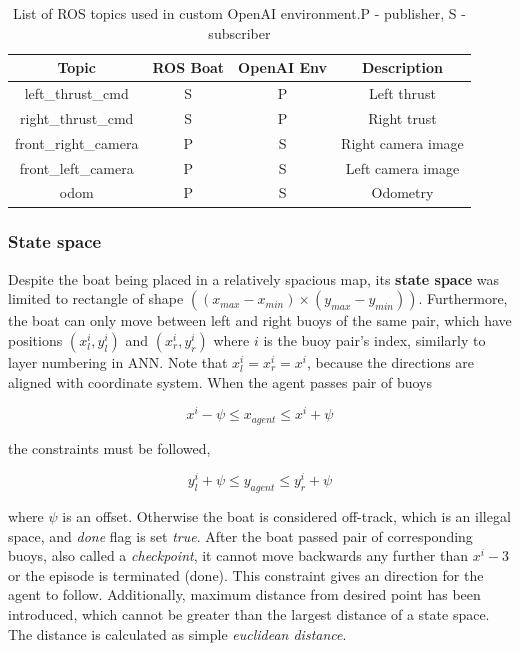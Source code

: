 \begin{table}[h]
    \centering
    \begin{tabular}{||c c c c||}
        \hline
        Topic & ROS Boat &  OpenAI Env & Description \\
        \hline\hline
        left\_thrust\_cmd & S & P & Left thrust \\
        right\_thrust\_cmd & S & P & Right trust \\
        front\_right\_camera & P & S & Right camera image \\
        front\_left\_camera & P & S & Left camera image \\
        odom & P & S & Odometry \\
        \hline
    \end{tabular}
    \caption{List of ROS topics used in custom OpenAI environment.\newline P - publisher, S - subscriber}
    \label{tab:ros-topics}
\end{table}

\subsubsection*{State space}
\label{sub2:state-space}

Despite the boat being placed in a relatively spacious map, its \textbf{state space} was limited to rectangle of shape $\left( (x_{max} - x_{min}) \times (y_{max} - y_{min})\right)$. Furthermore, the boat can only move between left and right buoys of the same pair, which have positions $(x^i_l, y^i_l)$ and $(x^i_r, y^i_r)$ where $i$ is the buoy pair's index, similarly to layer numbering in ANN. Note that $x^i_l = x^i_r = x^i$, because the directions are aligned with coordinate system. When the agent passes pair of buoys

\begin{equation}
    x^i - \psi \leq x_{agent} \leq x^i + \psi
\label{eq:5.1}
\end{equation}

the constraints must be followed,

\begin{equation}
    y^i_l + \psi \leq y_{agent} \leq y^i_r + \psi
\label{eq:5.2}
\end{equation}

where $\psi$ is an offset. Otherwise the boat is considered off-track, which is an illegal space, and \emph{done} flag is set \emph{true}. After the boat passed pair of corresponding buoys, also called a \emph{checkpoint}, it cannot move backwards any further than $x^i - 3$ or the episode is terminated (done). This constraint gives an direction for the agent to follow. Additionally, maximum distance from desired point has been introduced, which cannot be greater than the largest distance of a state space. The distance is calculated as simple \emph{euclidean distance}.

